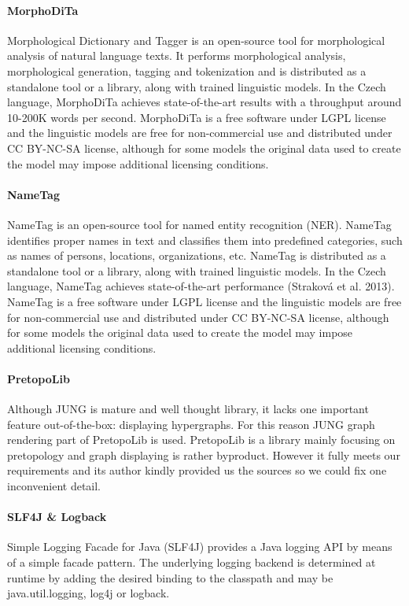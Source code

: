 \paragraph{MorphoDiTa}
Morphological Dictionary and Tagger is an open-source tool for morphological
analysis of natural language texts. It performs morphological analysis, 
morphological generation, tagging and tokenization and is distributed as
a standalone tool or a library, along with trained linguistic models. In
the Czech language, MorphoDiTa achieves state-of-the-art results with 
a throughput around 10-200K words per second. MorphoDiTa is a free software
under LGPL license and the linguistic models are free for non-commercial use
and distributed under CC BY-NC-SA license, although for some models the original
data used to create the model may impose additional licensing conditions.

\paragraph{NameTag}
NameTag is an open-source tool for named entity recognition (NER). NameTag 
identifies proper names in text and classifies them into predefined categories,
such as names of persons, locations, organizations, etc. NameTag is distributed
as a standalone tool or a library, along with trained linguistic models.
In the Czech language, NameTag achieves state-of-the-art performance
(Straková et al. 2013). NameTag is a free software under LGPL license and the 
linguistic models are free for non-commercial use and distributed under CC 
BY-NC-SA license, although for some models the original data used to create
the model may impose additional licensing conditions.

\paragraph{PretopoLib}
Although JUNG is mature and well thought library, it lacks one important feature
out-of-the-box: displaying hypergraphs. For this reason JUNG graph rendering
part of PretopoLib is used. PretopoLib is a library mainly focusing on
pretopology and graph displaying is rather byproduct. However it fully meets our
requirements and its author kindly provided us the sources so we could fix one
inconvenient detail.

\paragraph{SLF4J \& Logback}
Simple Logging Facade for Java (SLF4J) provides a Java logging API by means
of a simple facade pattern. The underlying logging backend is determined
at runtime by adding the desired binding to the classpath and may be
java.util.logging, log4j or logback.

